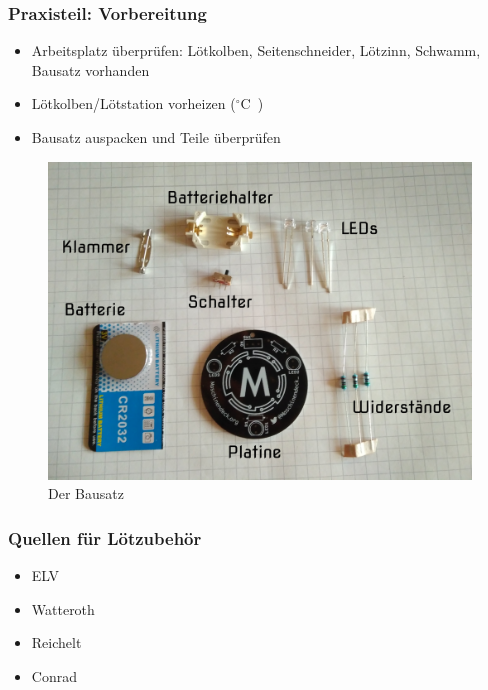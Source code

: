 \documentclass[10pt]{beamer}
\begin{document}
	\begin{frame}
	\frametitle{Praxisteil: Vorbereitung}
	\begin{itemize}
		\item{Arbeitsplatz überprüfen: Lötkolben, Seitenschneider, Lötzinn, Schwamm, Bausatz vorhanden}
		\item{Lötkolben/Lötstation vorheizen (\unit[350]{$^\circ$C})}
		\item{Bausatz auspacken und Teile überprüfen}
	\end{itemize}
	\begin{figure}[hbtp]
		\centering
		\includegraphics[width=\linewidth*5/10]{images/badge.jpg}
		\caption{Der Bausatz}
	\end{figure}
	\end{frame}

	\begin{frame}
		\frametitle{Quellen für Lötzubehör}
		\begin{itemize}
			\item{ELV}
			\item{Watteroth}
			\item{Reichelt}
			\item{Conrad}
		\end{itemize}
	\end{frame}

    
\end{document}
